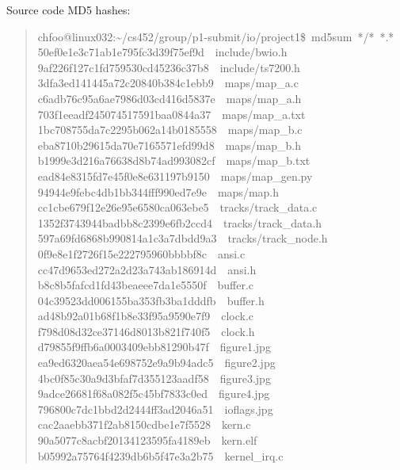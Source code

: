 \documentclass[letterpaper]{article}
\begin{document}
Source code MD5 hashes:
%
\begin{quote}{\ttfamily \raggedright \noindent
chfoo@linux032:\textasciitilde{}/cs452/group/p1-submit/io/project1\$~md5sum~*/*~*.*\\
50ef0e1e3c71ab1e795fc3d39f75ef9d~~include/bwio.h\\
9af226f127c1fd759530cd45236c37b8~~include/ts7200.h\\
3dfa3ed141445a72c20840b384c1ebb9~~maps/map\_a.c\\
c6adb76c95a6ae7986d03cd416d5837e~~maps/map\_a.h\\
703f1eeadf245074517591baa0844a37~~maps/map\_a.txt\\
1bc708755da7c2295b062a14b0185558~~maps/map\_b.c\\
eba8710b29615da70e7165571efd99d8~~maps/map\_b.h\\
b1999e3d216a76638d8b74ad993082cf~~maps/map\_b.txt\\
ead84e8315fd7e45f0e8e631197b9150~~maps/map\_gen.py\\
94944e9febc4db1bb344fff990ed7e9e~~maps/map.h\\
cc1cbe679f12e26e95e6580ca063ebe5~~tracks/track\_data.c\\
1352f3743944badbb8c2399e6fb2ccd4~~tracks/track\_data.h\\
597a69fd6868b990814a1c3a7dbdd9a3~~tracks/track\_node.h\\
0f9e8e1f2726f15e222795960bbbbf8c~~ansi.c\\
cc47d9653ed272a2d23a743ab186914d~~ansi.h\\
b8c8b5fafcd1fd43beaeee7da1e5550f~~buffer.c\\
04c39523dd006155ba353fb3ba1dddfb~~buffer.h\\
ad48b92a01b68f1b8e33f95a9590e7f9~~clock.c\\
f798d08d32ce37146d8013b821f740f5~~clock.h\\
d79855f9ffb6a0003409ebb81290b47f~~figure1.jpg\\
ea9ed6320aea54e698752e9a9b94adc5~~figure2.jpg\\
4bc0f85c30a9d3bfaf7d355123aadf58~~figure3.jpg\\
9adce26681f68a082f5c45bf7833c0ed~~figure4.jpg\\
796800c7dc1bbd2d2444ff3ad2046a51~~ioflags.jpg\\
cac2aaebb371f2ab8150cdbe1e7f5528~~kern.c\\
90a5077c8acbf20134123595fa4189eb~~kern.elf\\
b05992a75764f4239db6b5f47e3a2b75~~kernel\_irq.c\\
}
\end{quote}
\end{document}
